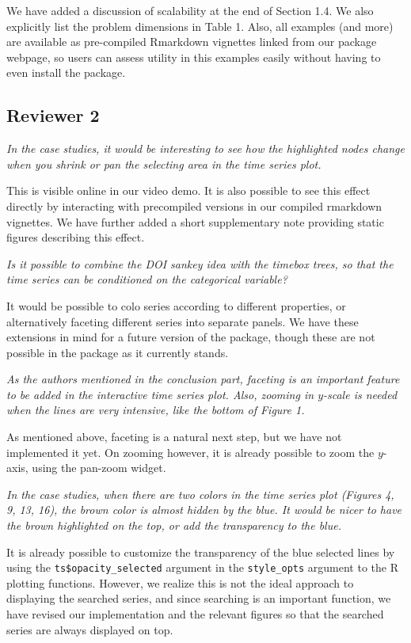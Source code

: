 \documentclass{article}
\begin{document}
We have added a discussion of scalability at the end of Section 1.4. We also
explicitly list the problem dimensions in Table 1. Also, all examples (and more)
are available as pre-compiled Rmarkdown vignettes linked from our package
webpage, so users can assess utility in this examples easily without having to
even install the package.

\subsection{Reviewer 2}

\textit{In the case studies, it would be interesting to see how the highlighted
  nodes change when you shrink or pan the selecting area in the time series
  plot.}

This is visible online in our video demo. It is also possible to see this effect
directly by interacting with precompiled versions in our compiled rmarkdown
vignettes. We have further added a short supplementary note providing static
figures describing this effect.

\textit{Is it possible to combine the DOI sankey idea with the timebox trees, so
  that the time series can be conditioned on the categorical variable?}

It would be possible to colo series according to different properties, or
alternatively faceting different series into separate panels. We have these
extensions in mind for a future version of the package, though these are not
possible in the package as it currently stands.

\textit{As the authors mentioned in the conclusion part, faceting is an
  important feature to be added in the interactive time series plot. Also,
  zooming in $y$-scale is needed when the lines are very intensive, like the
  bottom of Figure 1.}

As mentioned above, faceting is a natural next step, but we have not implemented
it yet. On zooming however, it is already possible to zoom the $y$-axis, using
the pan-zoom widget.

\textit{In the case studies, when there are two colors in the time series plot
  (Figures 4, 9, 13, 16), the brown color is almost hidden by the blue. It would
  be nicer to have the brown highlighted on the top, or add the transparency to
  the blue.}

It is already possible to customize the transparency of the blue selected lines
by using the \texttt{ts\$opacity\_selected} argument in the \texttt{style\_opts}
argument to the R plotting functions. However, we realize this is not the ideal
approach to displaying the searched series, and since searching is an important
function, we have revised our implementation and the relevant figures so that
the searched series are always displayed on top.
\end{document}

